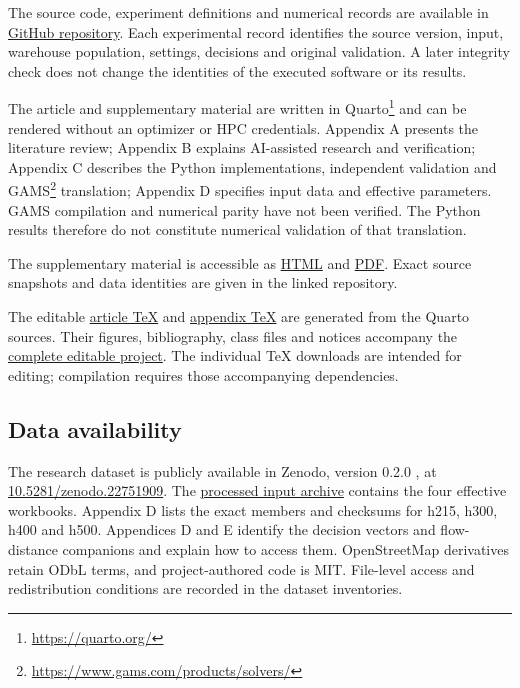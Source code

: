 \documentclass[
  english,
  11pt,
  a4paper,
  authoryear,
  preprint]{elsarticle}
\begin{document}
The source code, experiment definitions and numerical records are
available in
\href{https://github.com/unb-lamfo-or-ai-hpc/model-agrologistic}{GitHub
repository}. Each experimental record identifies the source version,
input, warehouse population, settings, decisions and original
validation. A later integrity check does not change the identities of
the executed software or its results.

The article and supplementary material are written in Quarto\footnote{\url{https://quarto.org/}}
and can be rendered without an optimizer or HPC credentials. Appendix A
presents the literature review; Appendix B explains AI-assisted research
and verification; Appendix C describes the Python implementations,
independent validation and GAMS\footnote{\url{https://www.gams.com/products/solvers/}}
translation; Appendix D specifies input data and effective parameters.
GAMS compilation and numerical parity have not been verified. The Python
results therefore do not constitute numerical validation of that
translation.

The supplementary material is accessible as
\href{https://unb-lamfo-or-ai-hpc.github.io/model-agrologistic/supplementary-review.html}{HTML}
and
\href{https://unb-lamfo-or-ai-hpc.github.io/model-agrologistic/supplementary-review.pdf}{PDF}.
Exact source snapshots and data identities are given in the linked
repository.

The editable
\href{https://unb-lamfo-or-ai-hpc.github.io/model-agrologistic/index.tex}{article
TeX} and
\href{https://unb-lamfo-or-ai-hpc.github.io/model-agrologistic/supplementary-review.tex}{appendix
TeX} are generated from the Quarto sources. Their figures, bibliography,
class files and notices accompany the
\href{https://unb-lamfo-or-ai-hpc.github.io/model-agrologistic/editable-sources.zip}{complete
editable project}. The individual TeX downloads are intended for
editing; compilation requires those accompanying dependencies.

\subsection{Data availability}\label{data-availability}

The research dataset is publicly available in Zenodo, version 0.2.0
\citep{celestino2026dataset}, at
\href{https://doi.org/10.5281/zenodo.22751909}{10.5281/zenodo.22751909}.
The
\href{https://zenodo.org/records/22751909/files/agrologistic-v020-inputs.zip?download=1}{processed
input archive} contains the four effective workbooks. Appendix D lists
the exact members and checksums for h215, h300, h400 and h500.
Appendices D and E identify the decision vectors and flow-distance
companions and explain how to access them. OpenStreetMap derivatives
retain ODbL terms, and project-authored code is MIT. File-level access
and redistribution conditions are recorded in the dataset inventories.
\end{document}
